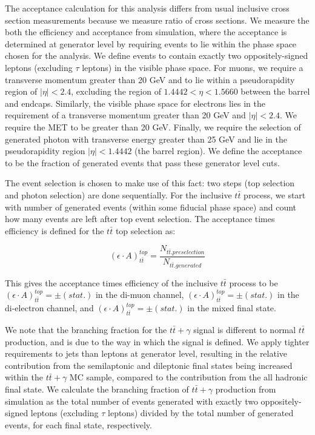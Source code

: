 The acceptance calculation for this analysis differs from usual inclusive cross section measurements because we measure ratio of cross sections. We measure the both the efficiency and acceptance from simulation, where the acceptance is determined at generator level by requiring events to lie within the phase space chosen for the analysis. We define events to contain exactly two oppositely-signed leptons (excluding $\tau$ leptons) in the visible phase space. For muons, we require a transverse momentum greater than 20 GeV and to lie within a pseudorapidity region of $|\eta| < 2.4$, excluding the region of $1.4442 < \eta < 1.5660$ between the barrel and endcaps. Similarly, the visible phase space for electrons lies in the requirement of a transverse momentum greater than 20 GeV and $|\eta| < 2.4$. We require the MET to be greater than 20 GeV. Finally, we require the selection of generated photon with transverse energy greater than 25 GeV and lie in the pseudorapidity region $|\eta| < 1.4442$ (the barrel region). We define the acceptance to be the fraction of generated events that pass these generator level cuts. 


The event selection is chosen to make use of this fact: two steps (top selection and photon selection) are done sequentially. For the inclusive $t\bar{t}$ process, we start with number of generated events (within some fiducial phase space) and count how many events are left after top event selection. The acceptance times efficiency is defined for the $t\bar{t}$ top selection as:

\begin{equation}
	(\epsilon \cdot A)_{t\bar{t}}^{top} = \frac{N_{t\bar{t}.preselection}}{N_{t\bar{t}.generated}} 
\end{equation}

This gives the acceptance times efficiency of the inclusive $t\bar{t}$ process to be $(\epsilon \cdot A)_{t\bar{t}}^{top} =   \pm  (stat.)$ in the di-muon channel, $(\epsilon \cdot A)_{t\bar{t}}^{top} =  \pm  (stat.)$ in the di-electron channel, and $(\epsilon \cdot A)_{t\bar{t}}^{top} =  \pm  (stat.)$ in the mixed final state.

We note that the branching fraction for the $t\bar{t}+\gamma$ signal is different to normal $t\bar{t}$ production, and is due to the way in which the signal is defined.  We apply tighter requirements to jets than leptons at generator level, resulting in the relative contribution from the semilaptonic and dileptonic final states being increased within the $t\bar{t}+\gamma$ MC sample, compared to the contribution from the all hadronic final state. We calculate the branching fraction of $t\bar{t}+\gamma$ production from simulation as the total number of events generated with exactly two oppositely-signed leptons (excluding $\tau$ leptons) divided by the total number of generated events, for each final state, respectively. 

